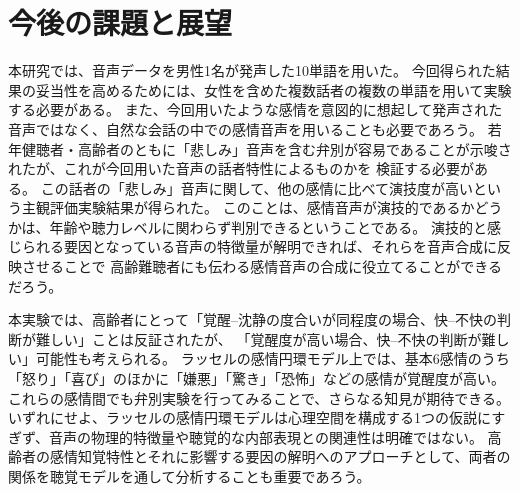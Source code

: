 

%




\section{今後の課題と展望}
\label{sec:Challenges}
本研究では、音声データを男性1名が発声した10単語を用いた。
今回得られた結果の妥当性を高めるためには、女性を含めた複数話者の複数の単語を用いて実験する必要がある。
また、今回用いたような感情を意図的に想起して発声された音声ではなく、自然な会話の中での感情音声を用いることも必要であろう。
若年健聴者・高齢者のともに「悲しみ」音声を含む弁別が容易であることが示唆されたが、これが今回用いた音声の話者特性によるものかを
検証する必要がある。
この話者の「悲しみ」音声に関して、他の感情に比べて演技度が高いという主観評価実験結果が得られた。
このことは、感情音声が演技的であるかどうかは、年齢や聴力レベルに関わらず判別できるということである。
演技的と感じられる要因となっている音声の特徴量が解明できれば、それらを音声合成に反映させることで
高齢難聴者にも伝わる感情音声の合成に役立てることができるだろう。

本実験では、高齢者にとって「覚醒–沈静の度合いが同程度の場合、快–不快の判断が難しい」ことは反証されたが、
「覚醒度が高い場合、快–不快の判断が難しい」可能性も考えられる。
ラッセルの感情円環モデル上では、基本6感情のうち「怒り」「喜び」のほかに「嫌悪」「驚き」「恐怖」などの感情が覚醒度が高い。
これらの感情間でも弁別実験を行ってみることで、さらなる知見が期待できる。
いずれにせよ、ラッセルの感情円環モデルは心理空間を構成する1つの仮説にすぎず、音声の物理的特徴量や聴覚的な内部表現との関連性は明確ではない。
高齢者の感情知覚特性とそれに影響する要因の解明へのアプローチとして、両者の関係を聴覚モデルを通して分析することも重要であろう。



